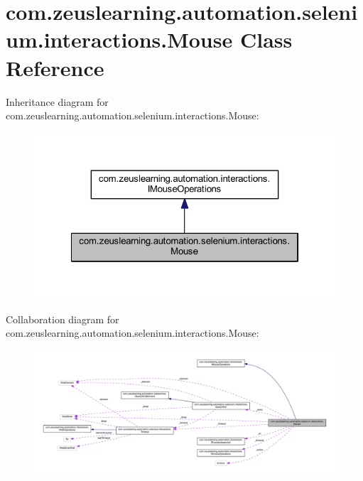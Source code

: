 \hypertarget{classcom_1_1zeuslearning_1_1automation_1_1selenium_1_1interactions_1_1Mouse}{}\section{com.\+zeuslearning.\+automation.\+selenium.\+interactions.\+Mouse Class Reference}
\label{classcom_1_1zeuslearning_1_1automation_1_1selenium_1_1interactions_1_1Mouse}


Inheritance diagram for com.\+zeuslearning.\+automation.\+selenium.\+interactions.\+Mouse\+:\nopagebreak
\begin{figure}[H]
\begin{center}
\leavevmode
\includegraphics[width=322pt]{de/d77/classcom_1_1zeuslearning_1_1automation_1_1selenium_1_1interactions_1_1Mouse__inherit__graph}
\end{center}
\end{figure}


Collaboration diagram for com.\+zeuslearning.\+automation.\+selenium.\+interactions.\+Mouse\+:
\nopagebreak
\begin{figure}[H]
\begin{center}
\leavevmode
\includegraphics[width=350pt]{d8/de2/classcom_1_1zeuslearning_1_1automation_1_1selenium_1_1interactions_1_1Mouse__coll__graph}
\end{center}
\end{figure}

